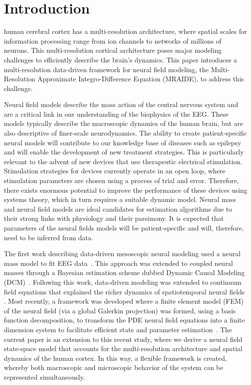 \documentclass[journal]{IEEEtran}
\begin{document}
\section{Introduction}
 human cerebral cortex has a multi-resolution architecture, where spatial scales for information processing range from ion channels to networks of millions of neurons. This multi-resolution cortical architecture poses major modeling challenges to efficiently describe the brain's dynamics. This paper introduces a multi-resolution data-driven framework for neural field modeling, the Multi-Resolution Approximate Integro-Difference Equation (MRAIDE), to address this challenge. 

Neural field models describe the mass action of the central nervous system and are a critical link in our understanding of the biophysics of the EEG. These models typically describe the macroscopic dynamics of the human brain, but are also descriptive of finer-scale neurodynamics. The ability to create patient-specific neural models will contribute to our knowledge base of diseases such as epilepsy and will enable the development of new treatment strategies. This is particularly relevant to the advent of new devices that use therapeutic electrical stimulation. Stimulation strategies for devices currently operate in an open loop, where stimulation parameters are chosen using a process of trial and error. Therefore, there exists enormous potential to improve the performance of these devices using systems theory, which in turn requires a suitable dynamic model. Neural mass and neural field models are ideal candidates for estimation algorithms due to their strong links with physiology and their parsimony. It is expected that parameters of the neural fields models will be patient-specific and will, therefore, need to be inferred from data.

The first work describing data-driven mesoscopic neural modeling used a neural mass model to fit EEG data~\cite{Valdes1999}. This approach was extended to coupled neural masses through a Bayesian estimation scheme dubbed Dynamic Causal Modeling (DCM)~\cite{David2003}. Following this work, data-driven modeling was extended to continuum field equations that explained the richer dynamics of spatiotemporal neural fields \cite{Galka2008,schiff2008kalman,Daunizeau2009}. Most recently, a framework was developed where a finite element model (FEM) of the neural field (via a global Galerkin projection) was formed, using a basis function decomposition, to transform the PDE neural field equations into a finite dimension system to facilitate efficient state and parameter estimation~\cite{Freestone2011}. The current paper is an extension to this recent study, where we derive a neural field state-space model that accounts for the multi-resolution architecture and spatial dynamics of the human cortex. In this way, a flexible framework is created, whereby both macroscopic and microscopic behavior of the system can be represented simultaneously.
\end{document}
